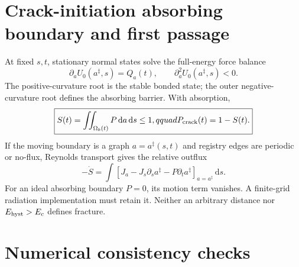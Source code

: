 \documentclass[11pt,letterpaper]{article}
\newcommand{\dd}{\,\mathrm d}
\begin{document}
\section{Crack-initiation absorbing boundary and first passage}
\label{sec:crack}

At fixed $s,t$, stationary normal states solve the full-energy force balance
\begin{equation}
 \boxed{\partial_aU_0(a^\ddagger,s)=Q_a(t),\qquad
 \partial_a^2U_0(a^\ddagger,s)<0.}
 \label{eq:normal-barrier}
\end{equation}
The positive-curvature root is the stable bonded state; the outer
negative-curvature root defines the absorbing barrier.  With absorption,
\begin{equation}
 \boxed{S(t)=\iint_{\Omega_b(t)}P\dd a\dd s\le1,qquad
 P_{\rm crack}(t)=1-S(t).}
 \label{eq:G4escape}
\end{equation}
If the moving boundary is a graph $a=a^\ddagger(s,t)$ and registry edges are
periodic or no-flux, Reynolds transport gives the relative outflux
\begin{equation}
 \boxed{-\dot S=\int\left[J_a-J_s\partial_sa^\ddagger-
 P\partial_ta^\ddagger\right]_{a=a^\ddagger}\dd s.}
 \label{eq:movingflux}
\end{equation}
For an ideal absorbing boundary $P=0$, its motion term vanishes.  A finite-grid
radiation implementation must retain it.  Neither an arbitrary distance nor
$E_{\rm hyst}>E_c$ defines fracture.

\section{Numerical consistency checks}
\label{sec:numerics}
\end{document}
